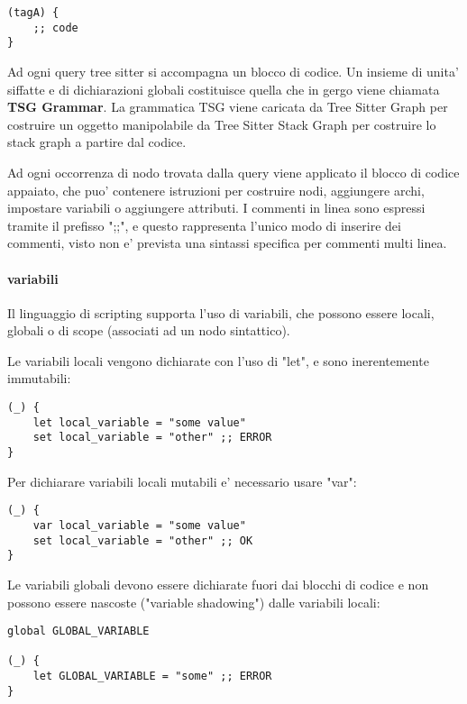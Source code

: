 \begin{verbatim}
(tagA) {
    ;; code
}
\end{verbatim}

Ad ogni query tree sitter si accompagna un blocco di codice.
Un insieme di unita' siffatte e di dichiarazioni globali costituisce quella che in gergo viene chiamata \textbf{TSG Grammar}. La grammatica TSG viene caricata da Tree Sitter Graph per costruire un oggetto manipolabile da Tree Sitter Stack Graph per costruire lo stack graph a partire dal codice.

Ad ogni occorrenza di nodo trovata dalla query viene applicato il blocco di codice appaiato, che puo' contenere istruzioni per costruire nodi, aggiungere archi, impostare variabili o aggiungere attributi.
I commenti in linea sono espressi tramite il prefisso ";;", e questo rappresenta l'unico modo di inserire dei commenti, visto non e' prevista una sintassi specifica per commenti multi linea.

\paragraph{variabili}
Il linguaggio di scripting supporta l'uso di variabili, che possono essere locali, globali o di scope (associati ad un nodo sintattico).

Le variabili locali vengono dichiarate con l'uso di "let", e sono inerentemente immutabili:

\begin{verbatim}
(_) {
    let local_variable = "some value"
    set local_variable = "other" ;; ERROR
}
\end{verbatim}

Per dichiarare variabili locali mutabili e' necessario usare "var":

\begin{verbatim}
(_) {
    var local_variable = "some value"
    set local_variable = "other" ;; OK
}
\end{verbatim}

Le variabili globali devono essere dichiarate fuori dai blocchi di codice e non possono essere nascoste ("variable shadowing") dalle variabili locali:

\begin{verbatim}
global GLOBAL_VARIABLE

(_) {
    let GLOBAL_VARIABLE = "some" ;; ERROR
}
\end{verbatim}

